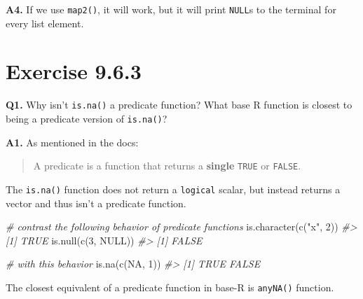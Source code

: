 \documentclass[
]{book}
\newenvironment{Shaded}{\begin{snugshade}}{\end{snugshade}}
\newcommand{\CommentTok}[1]{\textcolor[rgb]{0.56,0.35,0.01}{\textit{#1}}}
\newcommand{\ConstantTok}[1]{\textcolor[rgb]{0.00,0.00,0.00}{#1}}
\newcommand{\DecValTok}[1]{\textcolor[rgb]{0.00,0.00,0.81}{#1}}
\newcommand{\FunctionTok}[1]{\textcolor[rgb]{0.00,0.00,0.00}{#1}}
\newcommand{\NormalTok}[1]{#1}
\newcommand{\OtherTok}[1]{\textcolor[rgb]{0.56,0.35,0.01}{#1}}
\newcommand{\SpecialCharTok}[1]{\textcolor[rgb]{0.00,0.00,0.00}{#1}}
\newcommand{\StringTok}[1]{\textcolor[rgb]{0.31,0.60,0.02}{#1}}
\begin{document}
\textbf{A4.} If we use \texttt{map2()}, it will work, but it will print \texttt{NULL}s to the terminal for every list element.

\begin{Shaded}
\end{Shaded}

\hypertarget{exercise-9.6.3}{%
\section{Exercise 9.6.3}\label{exercise-9.6.3}}

\textbf{Q1.} Why isn't \texttt{is.na()} a predicate function? What base R function is closest to being a predicate version of \texttt{is.na()}?

\textbf{A1.} As mentioned in the docs:

\begin{quote}
A predicate is a function that returns a \textbf{single} \texttt{TRUE} or \texttt{FALSE}.
\end{quote}

The \texttt{is.na()} function does not return a \texttt{logical} scalar, but instead returns a vector and thus isn't a predicate function.

\begin{Shaded}
\begin{Highlighting}[]
\CommentTok{\# contrast the following behavior of predicate functions}
\FunctionTok{is.character}\NormalTok{(}\FunctionTok{c}\NormalTok{(}\StringTok{"x"}\NormalTok{, }\DecValTok{2}\NormalTok{))}
\CommentTok{\#\textgreater{} [1] TRUE}
\FunctionTok{is.null}\NormalTok{(}\FunctionTok{c}\NormalTok{(}\DecValTok{3}\NormalTok{, }\ConstantTok{NULL}\NormalTok{))}
\CommentTok{\#\textgreater{} [1] FALSE}

\CommentTok{\# with this behavior}
\FunctionTok{is.na}\NormalTok{(}\FunctionTok{c}\NormalTok{(}\ConstantTok{NA}\NormalTok{, }\DecValTok{1}\NormalTok{))}
\CommentTok{\#\textgreater{} [1]  TRUE FALSE}
\end{Highlighting}
\end{Shaded}

The closest equivalent of a predicate function in base-R is \texttt{anyNA()} function.
\end{document}
